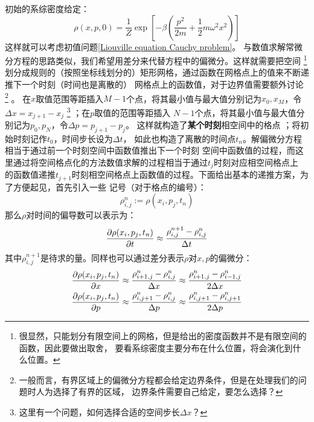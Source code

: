     初始的系综密度给定：
    \begin{equation}
        \rho(x, p, 0) = \frac{1}{Z}\exp\left[-\beta\left(\frac{p^2}{2m} + \frac{1}{2}m\omega^2x^2\right)\right]
    \end{equation}
    这样就可以考虑初值问题\ref{Liouville equation Cauchy problem}。
    与数值求解常微分方程的思路类似，我们希望用差分来代替方程中的偏微分。这样就需要把空间
    \footnote{
        很显然，只能划分有限空间上的网格，但是给出的密度函数并不是有限空间的函数，因此要做出取舍，
        要看系综密度主要分布在什么位置，将会演化到什么位置。
    }
    划分成规则的（按照坐标线划分的）矩形网格，通过函数在网格点上的值来不断递推下一个时刻（时间也是离散的）
    网格点上的函数值，对于边界值需要额外讨论
    \footnote{
        一般而言，有界区域上的偏微分方程都会给定边界条件，但是在处理我们的问题时人为选择了有界的区域，
        边界条件需要自己给定，要怎么选择？
    }
    。
    在$x$取值范围等距插入$M-1$个点，将其最小值与最大值分别记为$x_0, x_M$，令$\Delta x = x_{j+1} - x_j$
    \footnote{
        这里有一个问题，如何选择合适的空间步长$\Delta x$？
    }
    ；在$p$取值的范围等距插入
    $N-1$个点，将其最小值与最大值分别记为$p_0, p_N$，令$\Delta p = p_{j + 1} - p_j$。
    这样就构造了\textbf{某个时刻}相空间中的格点
    ；将初始时刻记作$t_0$，时间步长设为$\Delta t$，
    如此也构造了离散的时间点$t_n$。解偏微分方程相当于通过前一个时刻空间中函数值推出下一个时刻
    空间中函数值的过程，而这里通过将空间格点化的方法数值求解的过程相当于通过$t_j$时刻对应相空间格点上
    的函数值递推$t_{j+1}$时刻相空间格点上函数值的过程。下面给出基本的递推方案，为了方便起见，首先引入一些
    记号（对于格点的编号）：
    \begin{equation}
        \rho_{i, j}^{n} := \rho(x_i, p_j, t_n)
    \end{equation}
    那么$\rho$对时间的偏导数可以表示为：
    \begin{equation}
        \frac{\partial{\rho(x_i, p_j, t_n)}}{\partial{t}} \approx  \frac{\rho_{i, j}^{n + 1} - \rho_{i, j}^{n}}{\Delta t}
    \end{equation}
    其中$\rho_{i, j}^{n+1}$是待求的量。同样也可以通过差分表示$\rho$对$x, p$的偏微分：
    \begin{equation}
        \begin{split}
            \frac{\partial{\rho(x_i, p_j, t_n)}}{\partial{x}} &\approx \frac{\rho_{i + 1, j}^{n} - \rho_{i, j}^n}{\Delta x}
             \approx \frac{\rho_{i + 1, j}^{n} - \rho_{i-1, j}^n}{2\Delta x}\\
             \frac{\partial{\rho(x_i, p_j, t_n)}}{\partial{p}} &\approx \frac{\rho_{i, j+1}^{n} - \rho_{i, j}^n}{\Delta p}
             \approx \frac{\rho_{i, j+1}^{n} - \rho_{i, j+1}^n}{2\Delta p}
        \end{split}
    \end{equation}
